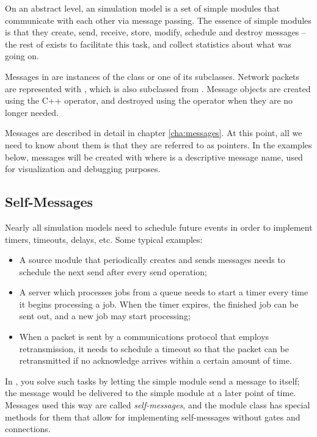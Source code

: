On an abstract level, an {\opp} simulation model is a set of
simple modules that communicate with each other via message passing.
The essence of simple modules is that they create, send, receive,
store, modify, schedule and destroy messages -- the rest of {\opp} exists
to facilitate this task, and collect statistics
about what was going on.

Messages in {\opp} are instances of the  class or one of
its subclasses. Network packets are represented with ,
which is also subclassed from . Message objects are
created using the C++  operator, and destroyed using the
 operator when they are no longer needed.

Messages are described in detail in chapter \ref{cha:messages}.
At this point, all we need to know about them is that they are
referred to as  pointers. In the examples below,
messages will be created with  where
 is a descriptive message name, used for visualization
and debugging purposes.


\subsection{Self-Messages}
\label{sec:simple-modules:self-messages}

Nearly all simulation models need to schedule future events in order
to implement timers, timeouts, delays, etc. Some typical examples:

\begin{itemize}
  \item A source module that periodically creates and sends messages
    needs to schedule the next send after every send operation;
  \item A server which processes jobs from a queue needs to start
    a timer every time it begins processing a job. When the timer
    expires, the finished job can be sent out, and a new job may
    start processing;
  \item When a packet is sent by a communications protocol that employs
    retransmission, it needs to schedule a timeout so that the packet
    can be retransmitted if no acknowledge arrives within a certain
    amount of time.
\end{itemize}

In {\opp}, you solve such tasks by letting the simple module send a message
to itself; the message would be delivered to the simple module at a later
point of time. Messages used this way are called
\textit{self-messages}, and the module class has
special methods for them that allow for implementing self-messages without
gates and connections.

